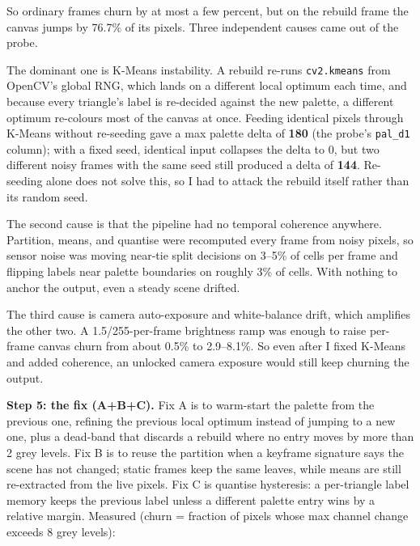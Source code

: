 \documentclass[11pt,a4paper]{article}
\begin{document}
So ordinary frames churn by at most a few percent, but on the rebuild frame the
canvas jumps by 76.7\% of its pixels. Three independent causes came out of the
probe.

The dominant one is K-Means instability. A rebuild re-runs \texttt{cv2.kmeans}
from OpenCV's global RNG, which lands on a different local optimum each time, and
because every triangle's label is re-decided against the new palette, a different
optimum re-colours most of the canvas at once. Feeding identical pixels through
K-Means without re-seeding gave a max palette delta of \textbf{180} (the probe's
\texttt{pal\_d1} column); with a fixed seed, identical input collapses the delta
to 0, but two different noisy frames with the same seed still produced a delta
of \textbf{144}. Re-seeding alone does not solve this, so I had to attack the
rebuild itself rather than its random seed.

The second cause is that the pipeline had no temporal coherence anywhere.
Partition, means, and quantise were recomputed every frame from noisy pixels, so
sensor noise was moving near-tie split decisions on 3--5\% of cells per frame and
flipping labels near palette boundaries on roughly 3\% of cells. With nothing to
anchor the output, even a steady scene drifted.

The third cause is camera auto-exposure and white-balance drift, which amplifies
the other two. A 1.5/255-per-frame brightness ramp was enough to raise per-frame
canvas churn from about 0.5\% to 2.9--8.1\%. So even after I fixed K-Means and
added coherence, an unlocked camera exposure would still keep churning the
output.

\textbf{Step 5: the fix (A+B+C).} Fix A is to warm-start the palette from the
previous one, refining the previous local optimum instead of jumping to a new
one, plus a dead-band that discards a rebuild where no entry moves by more than
2 grey levels. Fix B is to reuse the partition when a keyframe signature says
the scene has not changed; static frames keep the same leaves, while means are
still re-extracted from the live pixels. Fix C is quantise hysteresis: a
per-triangle label memory keeps the previous label unless a different palette
entry wins by a relative margin. Measured (churn = fraction of pixels whose max
channel change exceeds 8 grey levels):
\end{document}
